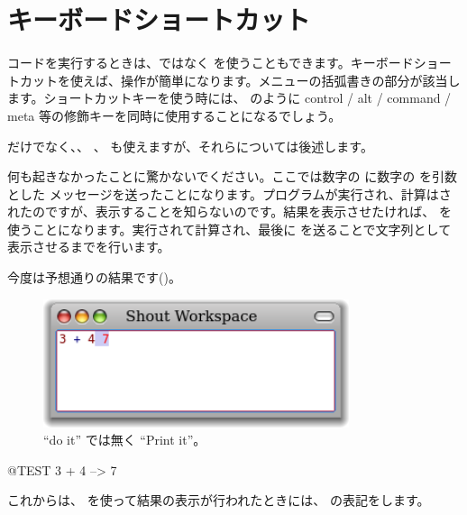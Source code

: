 \documentclass[a4paper,10pt,twoside]{book}
\begin{document}
\section{キーボードショートカット}

コードを実行するときは、\actclick ではなく を使うこともできます。キーボードショートカットを使えば、操作が簡単になります。メニューの括弧書きの部分が該当します。ショートカットキーを使う時には、 のように control / alt / command / meta 等の修飾キーを同時に使用することになるでしょう。


 だけでなく、、 、  も使えますが、それらについては後述します。


何も起きなかったことに驚かないでください。ここでは数字の  に数字の  を引数とした \ct{+} メッセージを送ったことになります。プログラムが実行され、計算はされたのですが、表示することを知らないのです。結果を表示させたければ、 を使うことになります。実行されて計算され、最後に  を送ることで文字列として表示させるまでを行います。

今度は予想通りの結果です()。

\begin{figure}[htb]
\centerline {\includegraphics[width=0.8\textwidth]{PrintIt}}
\caption{``do it'' では無く ``Print it''。}
\end{figure}

\begin{code}{@TEST}
3 + 4 --> 7
\end{code}
\noindent
これからは、 を使って結果の表示が行われたときには、\ct{-->} の表記をします。
\end{document}

